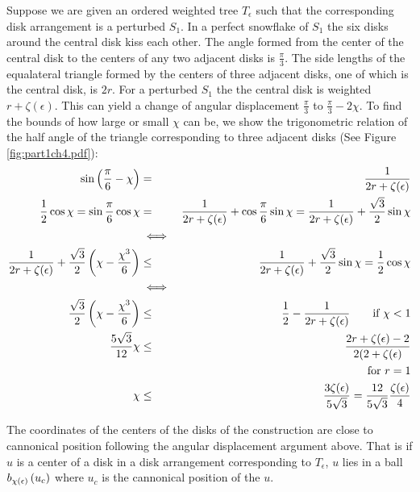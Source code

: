 Suppose we are given an ordered weighted tree $T_\epsilon$ such that the corresponding disk arrangement is a perturbed $S_1$.  
In a perfect snowflake of $S_1$ the six disks around the central disk kiss each other.  
The angle formed from the center of the central disk to the centers of any two adjacent disks is $\frac{\pi}{3}$.  
The side lengths of the equalateral triangle formed by the centers of three adjacent disks, one of which is the central disk, is $2r$.  
For a perturbed $S_1$ the the central disk is weighted $r+ \zeta(\epsilon)$.  
This can yield a change of angular displacement $\frac{\pi}{3}$ to $\frac{\pi}{3} - 2\chi$.  
To find the bounds of how large or small $\chi$ can be, we show the trigonometric relation of the half angle of the triangle corresponding to three adjacent disks (See Figure \ref{fig:part1ch4.pdf}):
\begin{eqnarray*}
\sin \left( \frac{\pi}{6} - \chi \right) &=& \frac{1}{2r+\zeta(\epsilon)}\\
\frac{1}{2}\cos \chi = \sin \frac{\pi}{6} \cos \chi &=& \frac{1}{2r+\zeta(\epsilon)} + \cos \frac{\pi}{6} \sin \chi = \frac{1}{2r+\zeta(\epsilon)} +\frac{\sqrt{3}}{2} \sin \chi \\
&\iff&\\
\frac{1}{2r+\zeta(\epsilon)} + \frac{\sqrt{3}}{2} \left(  \chi - \frac{\chi^3}{6} \right) &\leq& \frac{1}{2r+\zeta(\epsilon)} + \frac{\sqrt{3}}{2} \sin \chi =\frac{1}{2} \cos \chi\\
&\iff&\\
\frac{\sqrt{3}}{2} \left(  \chi - \frac{\chi^3}{6} \right)&\leq& \frac{1}{2}-\frac{1}{2r+\zeta(\epsilon)}  \qquad \text{if }\chi < 1 \\
\frac{5\sqrt{3}}{12} \chi &\leq&\frac{2r + \zeta(\epsilon) - 2}{2 ( 2 + \zeta(\epsilon)} \\
&&\text{for $r=1$}\\
\chi &\leq& \frac{3 \zeta(\epsilon)}{5\sqrt{3}}=\frac{12}{5\sqrt{3}} \frac{\zeta(\epsilon)}{4} 
\end{eqnarray*}

The coordinates of the centers of the disks of the construction are close to cannonical position following the angular displacement argument above.  
That is if $u$ is a center of a disk in a disk arrangement corresponding to $T_\epsilon$, $u$ lies in a ball $b_{\chi(\epsilon)}\left( u_c \right)$ where $u_c$ is the cannonical position of the $u$.  

